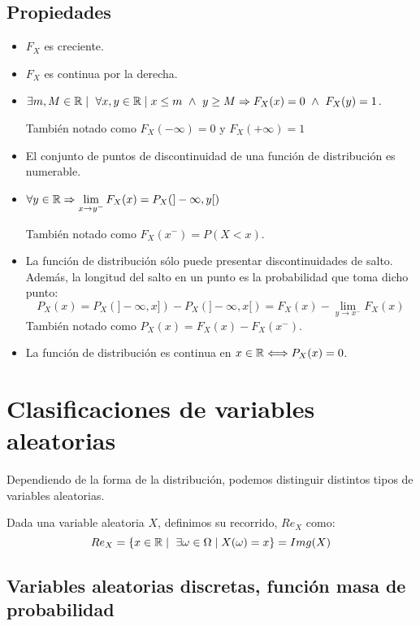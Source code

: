\subsection{Propiedades}
\begin{itemize}
\item $F_X$ es creciente.
\item $F_X$ es continua por la derecha.
\item $\exists m,M \in \mathbb R \mid \ \forall x,y \in \mathbb R \mid x \leq m \ \land \ y \geq M \Rightarrow F_X(x)=0
        \ \land \ F_X(y)=1$.\par
      También notado como $F_X(-\infty)=0$ y $F_X(+\infty)=1$
\item El conjunto de puntos de discontinuidad de una función de distribución es numerable.
\item $\forall y \in \mathbb R \Rightarrow \lim\limits_{x \to y^{-}} F_X(x) = P_X(]-\infty, y[)$\par
      También notado como $F_X(x^{-})=P(X<x)$.
\item La función de distribución sólo puede presentar discontinuidades de salto. Además, la longitud del salto
      en un punto es la probabilidad que toma dicho punto:
      $$P_X(x) = P_X(]-\infty, x]) - P_X(]-\infty, x[) = F_X(x) - \lim\limits_{y \to x^{-}}F_X(x)$$
      También notado como $P_X(x) = F_X(x) - F_X(x^{-})$.
\item La función de distribución es continua en $x \in \mathbb R \Longleftrightarrow P_X(x) = 0$.
\end{itemize}

\section{Clasificaciones de variables aleatorias}

Dependiendo de la forma de la distribución, podemos distinguir distintos tipos de variables aleatorias.
\begin{definicion}
    Dada una variable aleatoria $X$, definimos su recorrido, $Re_X$ como:
    $$Re_X = \{x \in \mathbb R \mid \ \exists \omega \in \Omega \mid X(\omega) = x\} = Img(X)$$
\end{definicion}

\subsection{Variables aleatorias discretas, función masa de probabilidad}

